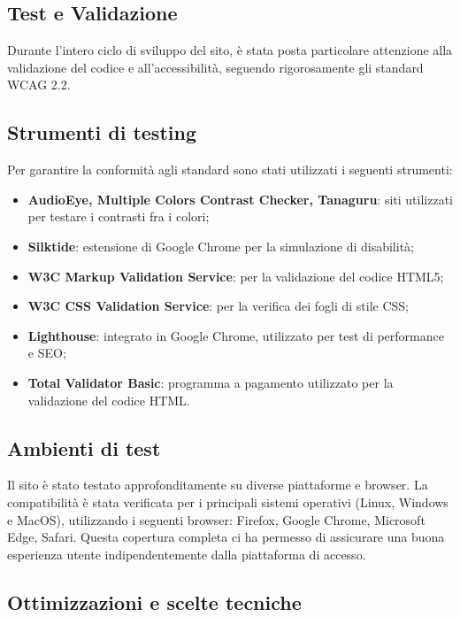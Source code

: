 \documentclass[a4paper, 12pt]{article}
\begin{document}
\begin{justify}
\section{Test e Validazione}

Durante l'intero ciclo di sviluppo del sito, è stata posta particolare attenzione alla validazione del codice e all'accessibilità, seguendo rigorosamente gli standard WCAG 2.2.

\subsection{Strumenti di testing}

Per garantire la conformità agli standard sono stati utilizzati i seguenti strumenti:
\begin{itemize}
    \item \textbf{AudioEye, Multiple Colors Contrast Checker, Tanaguru}: siti utilizzati per testare i contrasti fra i colori;
    \item \textbf{Silktide}: estensione di Google Chrome per la simulazione di disabilità;
    \item \textbf{W3C Markup Validation Service}: per la validazione del codice HTML5;
    \item \textbf{W3C CSS Validation Service}: per la verifica dei fogli di stile CSS;
    \item \textbf{Lighthouse}: integrato in Google Chrome, utilizzato per test di performance e SEO;
    \item \textbf{Total Validator Basic}: programma a pagamento utilizzato per la validazione del codice HTML.
\end{itemize}

\subsection{Ambienti di test}

Il sito è stato testato approfonditamente su diverse piattaforme e browser. La compatibilità è stata verificata per i principali sistemi operativi (Linux, Windows e MacOS), utilizzando i seguenti browser: Firefox, Google Chrome, Microsoft Edge, Safari. Questa copertura completa ci ha permesso di assicurare una buona esperienza utente indipendentemente dalla piattaforma di accesso.

\subsection{Ottimizzazioni e scelte tecniche}


\end{justify}
\end{document}
